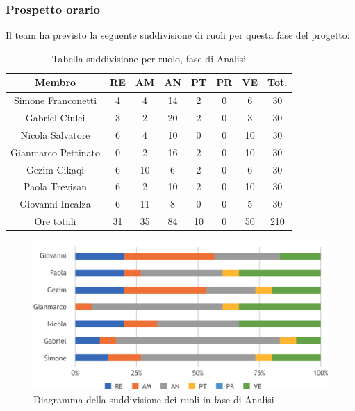 \subsubsection{Prospetto orario}
Il team ha previsto la seguente suddivisione di ruoli per questa fase del progetto:\\
\begin{table}[h]
\caption{Tabella suddivisione per ruolo, fase di Analisi}  
\begin{center}
\begin{tabular}{ |c|c|c|c|c|c|c|c|  }
 \hline
 Membro 		& RE 	& AM 	& AN 	& PT 	& PR 	& VE 	& Tot.\\
 \hline\hline
 Simone	Franconetti		& 4 		& 4 		& 14 	& 2 		& 0 		& 6 		& 30\\
 Gabriel Ciulei			& 3 		& 2 		& 20 	& 2 		& 0 		& 3 		& 30\\
 Nicola	Salvatore		& 6 		& 4 		& 10 	& 0 		& 0 		& 10 	& 30\\
 Gianmarco	Pettinato	& 0 		& 2 		& 16 	& 2 		& 0 		& 10 	& 30\\
 Gezim	Cikaqi			& 6 		& 10 	 	& 6 		& 2 		& 0 		& 6	 	& 30\\
 Paola	Trevisan		& 6 		& 2 		& 10 	& 2 		& 0 		& 10 	& 30\\
 Giovanni	Incalza		& 6 		& 11 		& 8 		& 0 		& 0 		& 5  	& 30\\
 \hline\hline
 Ore totali		& 31		& 35		& 84 	& 10 	& 0 		& 50 	& 210\\
  \hline
\end{tabular}
\end{center}
\end{table}
\begin{figure}[h!]
	\includegraphics[width=\textwidth]{res/img/hi17}
	\caption{Diagramma della suddivisione dei ruoli in fase di Analisi}
\end{figure}

